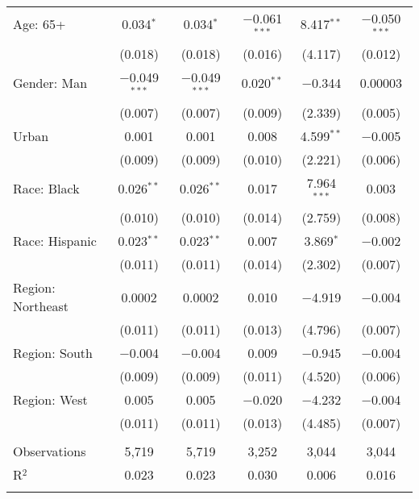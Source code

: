 \begin{tabular}{@{\extracolsep{5pt}}lccccc}
  Age: 65+ & 0.034$^{*}$ & 0.034$^{*}$ & $-$0.061$^{***}$ & 8.417$^{**}$ & $-$0.050$^{***}$ \\ 
  & (0.018) & (0.018) & (0.016) & (4.117) & (0.012) \\ 
  Gender: Man & $-$0.049$^{***}$ & $-$0.049$^{***}$ & 0.020$^{**}$ & $-$0.344 & 0.00003 \\ 
  & (0.007) & (0.007) & (0.009) & (2.339) & (0.005) \\ 
  Urban & 0.001 & 0.001 & 0.008 & 4.599$^{**}$ & $-$0.005 \\ 
  & (0.009) & (0.009) & (0.010) & (2.221) & (0.006) \\ 
  Race: Black & 0.026$^{**}$ & 0.026$^{**}$ & 0.017 & 7.964$^{***}$ & 0.003 \\ 
  & (0.010) & (0.010) & (0.014) & (2.759) & (0.008) \\ 
  Race: Hispanic & 0.023$^{**}$ & 0.023$^{**}$ & 0.007 & 3.869$^{*}$ & $-$0.002 \\ 
  & (0.011) & (0.011) & (0.014) & (2.302) & (0.007) \\ 
  Region: Northeast & 0.0002 & 0.0002 & 0.010 & $-$4.919 & $-$0.004 \\ 
  & (0.011) & (0.011) & (0.013) & (4.796) & (0.007) \\ 
  Region: South & $-$0.004 & $-$0.004 & 0.009 & $-$0.945 & $-$0.004 \\ 
  & (0.009) & (0.009) & (0.011) & (4.520) & (0.006) \\ 
  Region: West & 0.005 & 0.005 & $-$0.020 & $-$4.232 & $-$0.004 \\ 
  & (0.011) & (0.011) & (0.013) & (4.485) & (0.007) \\ 
 \hline \\[-1.8ex] 

Observations & 5,719 & 5,719 & 3,252 & 3,044 & 3,044 \\ 
R$^{2}$ & 0.023 & 0.023 & 0.030 & 0.006 & 0.016 \\ 
\hline 
\hline \\[-1.8ex] 
\end{tabular} 